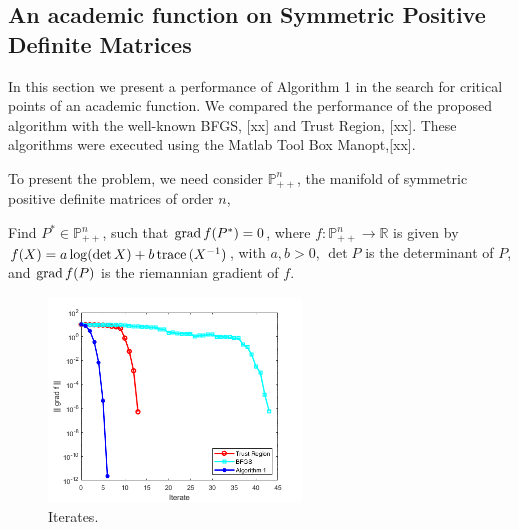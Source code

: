 \subsection{An academic function on Symmetric Positive Definite Matrices }

In this section we present a performance of Algorithm 1 in the search for critical points of an academic function. We compared the performance of the proposed algorithm with the well-known BFGS, [xx] and Trust Region, [xx]. These algorithms were executed using the Matlab Tool Box Manopt,[xx].

 To present the problem, we need consider  $ \mathbb{P}^n_{++}$, the manifold of symmetric positive definite matrices of order $n$,

\begin{problem}Find $P^* \in \mathbb{P}^n_{++}$, such that $\operatorname{grad} f(P^*) =0$, where $f:\mathbb{P}^n_{++} \to \mathbb{R}$ is given by  $f(X) = a \log(\det X) + b \,\mbox{trace}\, (X^{-1})$, with $a,b > 0$, $\det P$ is the determinant of $P$,   and $\operatorname{grad} f(P)$ is the riemannian gradient of $f$.
\end{problem}


\begin{figure}
	\centering
	\includegraphics[width=0.6\textwidth]{logdet_iter.png}
	\caption{Iterates.}
	\label{fig:logdetfig}
\end{figure}


